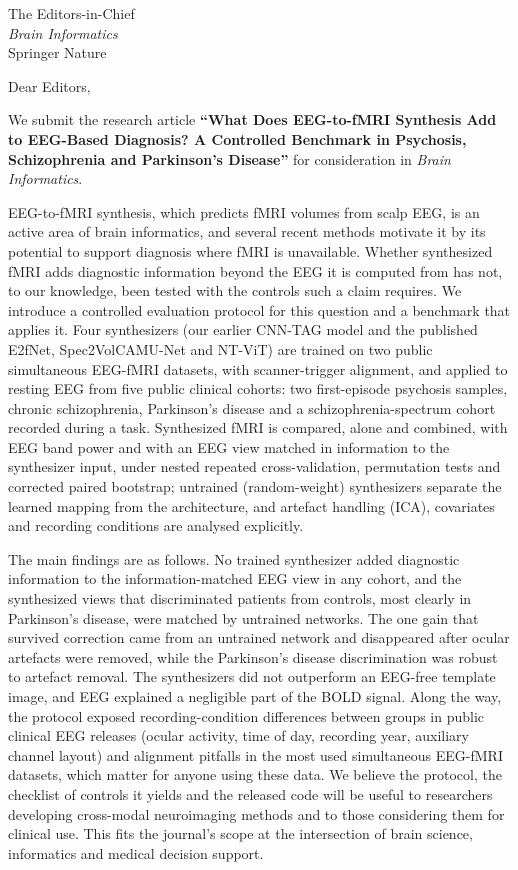 \documentclass[11pt]{letter}
\begin{document}
\begin{letter}{The Editors-in-Chief\\\textit{Brain Informatics}\\Springer Nature}
\opening{Dear Editors,}

We submit the research article \textbf{``What Does EEG-to-fMRI Synthesis Add to EEG-Based Diagnosis? A Controlled Benchmark in Psychosis, Schizophrenia and Parkinson's Disease''} for consideration in \textit{Brain Informatics}.

EEG-to-fMRI synthesis, which predicts fMRI volumes from scalp EEG, is an active area of brain informatics, and several recent methods motivate it by its potential to support diagnosis where fMRI is unavailable. Whether synthesized fMRI adds diagnostic information beyond the EEG it is computed from has not, to our knowledge, been tested with the controls such a claim requires. We introduce a controlled evaluation protocol for this question and a benchmark that applies it. Four synthesizers (our earlier CNN-TAG model and the published E2fNet, Spec2VolCAMU-Net and NT-ViT) are trained on two public simultaneous EEG-fMRI datasets, with scanner-trigger alignment, and applied to resting EEG from five public clinical cohorts: two first-episode psychosis samples, chronic schizophrenia, Parkinson's disease and a schizophrenia-spectrum cohort recorded during a task. Synthesized fMRI is compared, alone and combined, with EEG band power and with an EEG view matched in information to the synthesizer input, under nested repeated cross-validation, permutation tests and corrected paired bootstrap; untrained (random-weight) synthesizers separate the learned mapping from the architecture, and artefact handling (ICA), covariates and recording conditions are analysed explicitly.

The main findings are as follows. No trained synthesizer added diagnostic information to the information-matched EEG view in any cohort, and the synthesized views that discriminated patients from controls, most clearly in Parkinson's disease, were matched by untrained networks. The one gain that survived correction came from an untrained network and disappeared after ocular artefacts were removed, while the Parkinson's disease discrimination was robust to artefact removal. The synthesizers did not outperform an EEG-free template image, and EEG explained a negligible part of the BOLD signal. Along the way, the protocol exposed recording-condition differences between groups in public clinical EEG releases (ocular activity, time of day, recording year, auxiliary channel layout) and alignment pitfalls in the most used simultaneous EEG-fMRI datasets, which matter for anyone using these data. We believe the protocol, the checklist of controls it yields and the released code will be useful to researchers developing cross-modal neuroimaging methods and to those considering them for clinical use. This fits the journal's scope at the intersection of brain science, informatics and medical decision support.


\end{letter}
\end{document}
